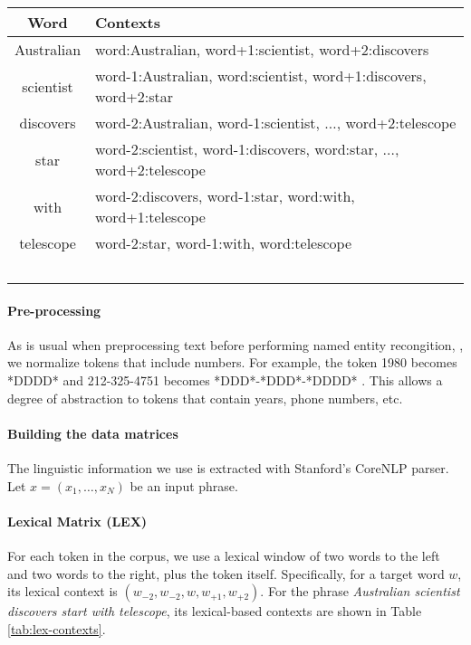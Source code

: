 \documentclass[11pt]{article}
\begin{document}
\begin{table*}[ht]
\centering
\begin{tabular}{cl}
\hline 
 Word & Contexts \\ 
\hline 
Australian & word:Australian, word+1:scientist, word+2:discovers\\ 
scientist  &  word-1:Australian, word:scientist, word+1:discovers, word+2:star\\ 
discovers & word-2:Australian, word-1:scientist, $\dots$, word+2:telescope \\ 
star & word-2:scientist, word-1:discovers, word:star, $\dots$, word+2:telescope \\ 
with & word-2:discovers, word-1:star, word:with, word+1:telescope \\ 
telescope  &  word-2:star, word-1:with, word:telescope \\ 
\hline \
\end{tabular} 
\label{tab:lex-contexts}
\caption{Lexical contexts corresponding to the phrase \textit{Australian scientist discovers start with telescope}.}
\end{table*} 
\paragraph{Pre-processing}
As is usual when preprocessing text before performing named entity recongition, \cite{RatinovR09}, we normalize tokens that include numbers. For example, the token 1980 becomes *DDDD* and 212-325-4751 becomes *DDD*-*DDD*-*DDDD* . This allows a degree of abstraction to tokens that contain years, phone
numbers, etc.
\paragraph{Building the data matrices}
The linguistic information we use is extracted with Stanford’s CoreNLP parser.
Let $x = (x_1, \dots , x_N )$ be an input phrase.
\paragraph{Lexical Matrix (LEX)}
For each token in the corpus, we use a lexical window of two words to the left and two words to the right, plus the token itself. Specifically, for a target word $w$, its lexical context is $(w_{-2}, w_{-2}, w, w_{+1}, w_{+2})$.  For the phrase \textit{Australian scientist discovers start with telescope}, its lexical-based contexts are shown in Table \ref{tab:lex-contexts}.
\vspace{.6cm}
\end{document}
